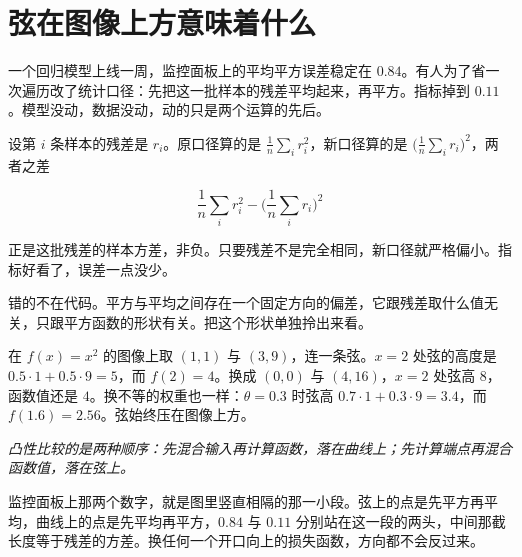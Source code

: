 \section{弦在图像上方意味着什么}
\label{sec:09-Convex-Optimization/03-Convex-Functions/01}

一个回归模型上线一周，监控面板上的平均平方误差稳定在 \(0.84\)。有人为了省一次遍历改了统计口径：先把这一批样本的残差平均起来，再平方。指标掉到 \(0.11\)。模型没动，数据没动，动的只是两个运算的先后。

设第 \(i\) 条样本的残差是 \(r_i\)。原口径算的是 \(\frac1n\sum_i r_i^2\)，新口径算的是 \(\big(\frac1n\sum_i r_i\big)^2\)，两者之差

\[
\frac1n\sum_i r_i^2-\Big(\frac1n\sum_i r_i\Big)^2
\]

正是这批残差的样本方差，非负。只要残差不是完全相同，新口径就严格偏小。指标好看了，误差一点没少。

错的不在代码。平方与平均之间存在一个固定方向的偏差，它跟残差取什么值无关，只跟平方函数的形状有关。把这个形状单独拎出来看。

在 \(f(x)=x^2\) 的图像上取 \((1,1)\) 与 \((3,9)\)，连一条弦。\(x=2\) 处弦的高度是 \(0.5\cdot1+0.5\cdot9=5\)，而 \(f(2)=4\)。换成 \((0,0)\) 与 \((4,16)\)，\(x=2\) 处弦高 \(8\)，函数值还是 \(4\)。换不等的权重也一样：\(\theta=0.3\) 时弦高 \(0.7\cdot1+0.3\cdot9=3.4\)，而 \(f(1.6)=2.56\)。弦始终压在图像上方。

\begin{center}

\emph{凸性比较的是两种顺序：先混合输入再计算函数，落在曲线上；先计算端点再混合函数值，落在弦上。}
\end{center}

监控面板上那两个数字，就是图里竖直相隔的那一小段。弦上的点是先平方再平均，曲线上的点是先平均再平方，\(0.84\) 与 \(0.11\) 分别站在这一段的两头，中间那截长度等于残差的方差。换任何一个开口向上的损失函数，方向都不会反过来。

